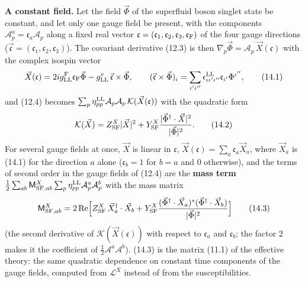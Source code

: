 \documentclass[
  10pt,
]{article}
\begin{document}
\textbf{A constant field.} Let the field \(\vec\Phi\) of the superfluid
boson singlet state be constant, and let only one gauge field be
present, with the components
\(\mathcal A^a_p=\mathfrak c_a\mathcal A_p\) along a fixed real vector
\(\mathfrak c=(\mathfrak c_1,\mathfrak c_2,\mathfrak c_3,\mathfrak c_{\rm F})\)
of the four gauge directions
(\(\vec{\mathfrak c}=(\mathfrak c_1,\mathfrak c_2,\mathfrak c_3)\)). The
covariant derivative (12.3) is then
\(\nabla_p\vec\Phi=\mathcal A_p\,\vec X(\mathfrak c)\) with the complex
isospin vector
\[\vec X(\mathfrak c)=2ig^{\rm F}_{\rm LL}\mathfrak c_{\rm F}\vec\Phi-g^{\rm v}_{\rm LL}\,\vec{\mathfrak c}\times\vec\Phi,\qquad(\vec{\mathfrak c}\times\vec\Phi)_\iota=\sum_{\iota'\iota''}\epsilon^{\rm LL}_{\iota\iota'\iota''}\mathfrak c_{\iota'}\Phi^{\iota''},\tag{14.1}\]
and (12.4) becomes
\(\sum_p\eta^{\rm LL}_{pp}\mathcal A_p\mathcal A_p\,\mathcal K(\vec X(\mathfrak c))\)
with the quadratic form
\[\mathcal K(\vec X)=Z^X_{\rm SF}\lvert\vec X\rvert^2+Y^X_{\rm SF}\frac{\lvert\vec\Phi^\dagger\cdot\vec X\rvert^2}{\lvert\vec\Phi\rvert^2}.\tag{14.2}\]
For several gauge fields at once, \(\vec X\) is linear in
\(\mathfrak c\), \(\vec X(\mathfrak c)=\sum_a\mathfrak c_a\vec X_a\),
where \(\vec X_a\) is (14.1) for the direction \(a\) alone
(\(\mathfrak c_b=1\) for \(b=a\) and 0 otherwise), and the terms of
second order in the gauge fields of (12.4) are the \textbf{mass term}
\(\tfrac12\sum_{ab}\mathsf M^X_{{\rm SF},ab}\sum_p\eta^{\rm LL}_{pp}\mathcal A^a_p\mathcal A^b_p\)
with the mass matrix
\[\mathsf M^X_{{\rm SF},ab}=2\,\mathrm{Re}\Big[Z^X_{\rm SF}\,\vec X_a^\dagger\cdot\vec X_b+Y^X_{\rm SF}\frac{(\vec\Phi^\dagger\cdot\vec X_a)^*(\vec\Phi^\dagger\cdot\vec X_b)}{\lvert\vec\Phi\rvert^2}\Big]\tag{14.3}\]
(the second derivative of \(\mathcal K(\vec X(\mathfrak c))\) with
respect to \(\mathfrak c_a\) and \(\mathfrak c_b\); the factor 2 makes
it the coefficient of \(\tfrac12\mathcal A^a\mathcal A^b\)). (14.3) is
the matrix (11.1) of the effective theory: the same quadratic dependence
on constant time components of the gauge fields, computed from
\(\mathcal L^X\) instead of from the susceptibilities.
\end{document}

